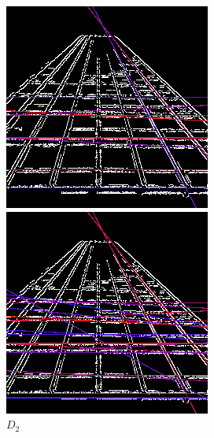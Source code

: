 \documentclass[12pt,a4paper,notitlepage,oneside,amsmath,amssymb]{article}
\begin{document}
\begin{CJK*}{UTF8}{bkai}
\begin{enumerate}[label=(\alph*)]
		      \begin{figure}[hbt!]
			      \centering
			      \begin{minipage}{.5\textwidth}
				      \centering
				      \includegraphics[width=.8\linewidth]{image_D1}
				      \caption*{\(D_1\)}
			      \end{minipage}%
			      \begin{minipage}{.5\textwidth}
				      \centering
				      \includegraphics[width=.8\linewidth]{image_D2}
				      \caption*{\(D_2\)}
			      \end{minipage}
		      \end{figure}


\end{enumerate}
\end{CJK*}
\end{document}
